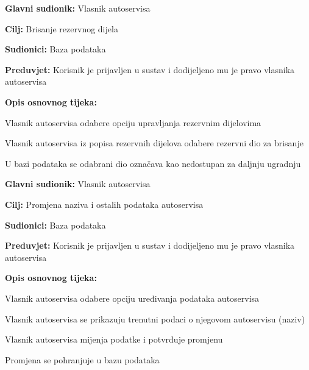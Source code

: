 \noindent {}
\begin{packed_item}
	
	\item \textbf{Glavni sudionik: } Vlasnik autoservisa
	\item  \textbf{Cilj:} Brisanje rezervnog dijela
	\item  \textbf{Sudionici:} Baza podataka
	\item  \textbf{Preduvjet:} Korisnik je prijavljen u sustav i dodijeljeno
	mu je pravo vlasnika autoservisa
	\item  \textbf{Opis osnovnog tijeka:}
	
	\item[] \begin{packed_enum}
		
		\item Vlasnik autoservisa odabere opciju upravljanja rezervnim dijelovima
		\item Vlasnik autoservisa iz popisa rezervnih dijelova odabere rezervni
		dio za brisanje
		\item U bazi podataka se odabrani dio označava kao nedostupan za daljnju
		ugradnju
		
	\end{packed_enum}
\end{packed_item}

\noindent {}
\begin{packed_item}
	
	\item \textbf{Glavni sudionik: } Vlasnik autoservisa
	\item  \textbf{Cilj:} Promjena naziva i ostalih podataka autoservisa
	\item  \textbf{Sudionici:} Baza podataka
	\item  \textbf{Preduvjet:} Korisnik je prijavljen u sustav i dodijeljeno
	mu je pravo vlasnika autoservisa
	\item  \textbf{Opis osnovnog tijeka:}
	
	\item[] \begin{packed_enum}
		
		\item Vlasnik autoservisa odabere opciju uređivanja podataka autoservisa
		\item Vlasnik autoservisa se prikazuju trenutni podaci o njegovom
		autoservisu (naziv)
		\item Vlasnik autoservisa mijenja podatke i potvrđuje promjenu
		\item Promjena se pohranjuje u bazu podataka
		
	\end{packed_enum}
\end{packed_item}

